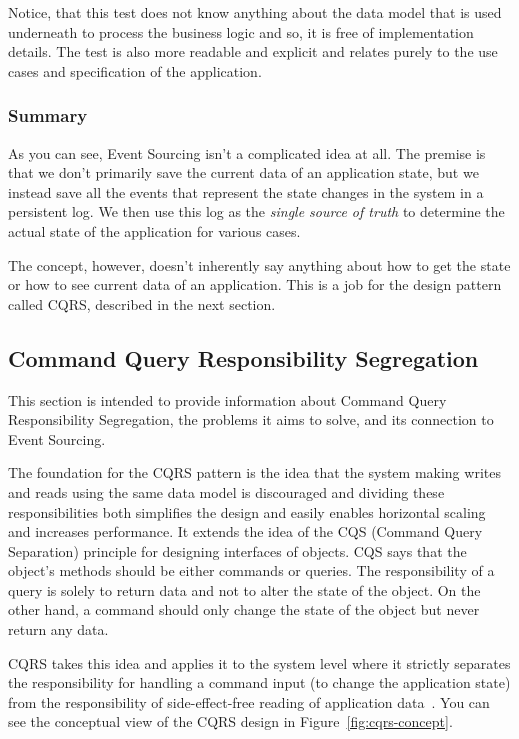 \documentclass{book}
\begin{document}
Notice, that this test does not know anything about the data model that is
used underneath to process the business logic and so, it is free of
implementation details. The test is also more readable and explicit and
relates purely to the use cases and specification of the application.~\cite{es-testing}


\subsubsection{Summary}\label{summary}

As you can see, Event Sourcing isn't a complicated idea at all. The
premise is that we don't primarily save the current data of an
application state, but we instead save all the events that represent the
state changes in the system in a persistent log. We then use this log as
the \emph{single source of truth} to determine the actual state of the
application for various cases.

The concept, however, doesn't inherently say anything about how to get
the state or how to see current data of an application. This is a job
for the design pattern called CQRS, described in the next section.


\subsection{Command Query Responsibility
Segregation}\label{command-query-responsibility-segregation}

This section is intended to provide information about Command Query
Responsibility Segregation, the problems it aims to solve, and its
connection to Event Sourcing.

The foundation for the CQRS pattern is the idea that the system making
writes and reads using the same data model is discouraged and dividing
these responsibilities both simplifies the design and easily enables
horizontal scaling and increases performance. It extends the idea of the
CQS (Command Query Separation) principle for designing interfaces of
objects. CQS says that the object's methods should be either commands or
queries. The responsibility of a query is solely to return data and not
to alter the state of the object. On the other hand, a command should
only change the state of the object but never return any data.~\cite{journey}

CQRS takes this idea and applies it to the system level where it
strictly separates the responsibility for handling a command input (to
change the application state) from the responsibility of
side-effect-free reading of application data~\cite{journey}. You can see
the conceptual view of the CQRS design in Figure~\ref{fig:cqrs-concept}.
\end{document}
